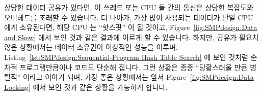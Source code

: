 \fi

상당한 데이터 공유가 있다면, 이 쓰레드 또는 CPU 들 간의 통신은 상당한 복잡도와
오버헤드를 초래할 수 있습니다.
더 나아가, 가장 많이 사용되는 데이터가 단일 CPU 에게 소유된다면, 해당 CPU 는
``핫스팟'' 이 될 것이고, Figure~\ref{fig:SMPdesign:Data and Skew} 에서 보인
것과 같은 결과에 이르게 할 수 있습니다.
하지만, 공유가 필요치 않은 상황에서는 데이터 소유권이 이상적인 성능을 이루며,
Listing~\ref{lst:SMPdesign:Sequential-Program Hash Table Search} 에 보인 것처럼
순차적 프로그램만큼이나 코드도 단순해 집니다.
그런 상황은 종종 ``당황스러울 만큼 병렬적'' 이라고 이야기 되며, 가장 좋은
상황에서는 앞서 Figure~\ref{fig:SMPdesign:Data Locking} 에서 보인 것과 같은
상황을 가능하게 합니다.

